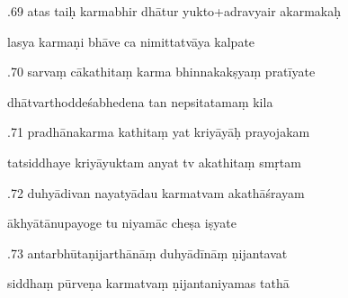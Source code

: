\documentclass[article,12pt,a4paper]{memoir}%
\newcounter{parCount}
\begin{document}
	  
	  \pstart {}.69 atas taiḥ karmabhir dhātur yukto+adravyair akarmakaḥ 
	{}
	\pend%
      

	  
	  \pstart \leavevmode%
	lasya karmaṇi bhāve ca nimittatvāya kalpate 
	{}
	\pend%
      

	  
	  \pstart {}.70 sarvaṃ cākathitaṃ karma bhinnakakṣyaṃ pratīyate 
	{}
	\pend%
      

	  
	  \pstart \leavevmode%
	dhātvarthoddeśabhedena tan nepsitatamaṃ kila 
	{}
	\pend%
      

	  
	  \pstart {}.71 pradhānakarma kathitaṃ yat kriyāyāḥ prayojakam 
	{}
	\pend%
      

	  
	  \pstart \leavevmode%
	tatsiddhaye kriyāyuktam anyat tv akathitaṃ smṛtam 
	{}
	\pend%
      

	  
	  \pstart {}.72 duhyādivan nayatyādau karmatvam akathāśrayam 
	{}
	\pend%
      

	  
	  \pstart \leavevmode%
	ākhyātānupayoge tu niyamāc cheṣa iṣyate 
	{}
	\pend%
      

	  
	  \pstart {}.73 antarbhūtaṇijarthānāṃ duhyādīnāṃ ṇijantavat 
	{}
	\pend%
      

	  
	  \pstart \leavevmode%
	siddhaṃ pūrveṇa karmatvaṃ ṇijantaniyamas tathā 
	{}
	\pend%
      
\end{document}
